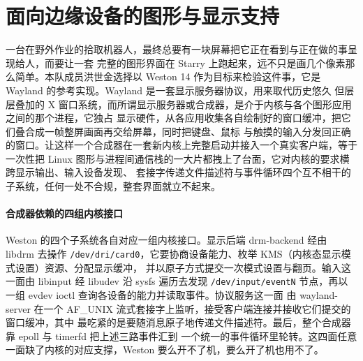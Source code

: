 \section{面向边缘设备的图形与显示支持}\label{sec:wayland}

一台在野外作业的拾取机器人，最终总要有一块屏幕把它正在看到与正在做的事呈现给人，而要让一套
完整的图形界面在 Starry 上跑起来，远不只是画几个像素那么简单。本队成员洪世金选择以 Weston 14
作为目标来检验这件事，它是 Wayland 的参考实现。Wayland 是一套显示服务器协议，用来取代历史悠久
但层层叠加的 X 窗口系统，而所谓显示服务器或合成器，是介于内核与各个图形应用之间的那个进程，它独占
显示硬件，从各应用收集各自绘制好的窗口缓冲，把它们叠合成一帧整屏画面再交给屏幕，同时把键盘、鼠标
与触摸的输入分发回正确的窗口。让这样一个合成器在一套新内核上完整启动并接入一个真实客户端，等于
一次性把 Linux 图形与进程间通信栈的一大片都拽上了台面，它对内核的要求横跨显示输出、输入设备发现、
套接字传递文件描述符与事件循环四个互不相干的子系统，任何一处不合规，整套界面就立不起来。

\paragraph{合成器依赖的四组内核接口}
Weston 的四个子系统各自对应一组内核接口。显示后端 drm-backend 经由 libdrm 去操作
\texttt{/dev/dri/card0}，它要协商设备能力、枚举 KMS（内核态显示模式设置）资源、分配显示缓冲，
并以原子方式提交一次模式设置与翻页。输入这一面由 libinput 经 libudev 沿 sysfs 遍历去发现
\texttt{/dev/input/eventN} 节点，再以一组 evdev ioctl 查询各设备的能力并读取事件。协议服务这一面
由 wayland-server 在一个 AF\_UNIX 流式套接字上监听，接受客户端连接并接收它们提交的窗口缓冲，其中
最吃紧的是要随消息原子地传递文件描述符。最后，整个合成器靠 epoll 与 timerfd 把上述三路事件汇到
一个统一的事件循环里轮转。这四面任意一面缺了内核的对应支撑，Weston 要么开不了机，要么开了机也用不了。

